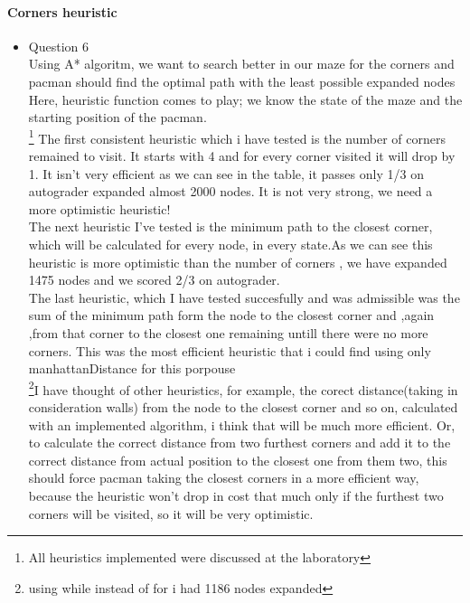 \paragraph{Corners heuristic}
\begin{itemize}
\item{Question 6}\\
	
	\tab Using A* algoritm, we want to search better in our maze for the corners and pacman should find the optimal path with the least possible expanded nodes Here, heuristic function comes to play; we know the state of the maze and the starting position of the pacman.\\
	\tab \footnote{All heuristics implemented were discussed at the laboratory} The first consistent heuristic which i have tested is the number of corners remained to visit. It starts with 4 and for every corner visited it will drop by 1. It isn't very efficient as we can see in the table, it passes only 1/3 on autograder expanded almost 2000 nodes. It is not very strong, we need a more optimistic heuristic!\\
	\tab The next heuristic I've tested is the minimum path to the closest corner, which will be calculated for every node, in every state.As we can see this heuristic is more optimistic than the number of corners , we have expanded 1475 nodes and we scored 2/3 on autograder.\\
	\tab The last heuristic, which I have tested succesfully and was admissible was the sum of the minimum path form the node to the closest corner and ,again ,from that corner to the closest one remaining untill there were no more corners. This was the most efficient heuristic that i could find using only manhattanDistance for this porpouse\\
	\tab \footnote{using while instead of for i had 1186 nodes expanded}I have thought of other heuristics, for example, the corect distance(taking in consideration walls) from the node to the closest corner and so on, calculated with an implemented algorithm, i think that will be much more efficient. Or, to calculate the correct distance from two furthest corners and add it to the correct distance from actual position to the closest one from them two, this should force pacman taking the closest corners in a more efficient way, because the heuristic won't drop in cost that much only if the furthest two corners will be visited, so it will be very optimistic.\\


\end{itemize}
